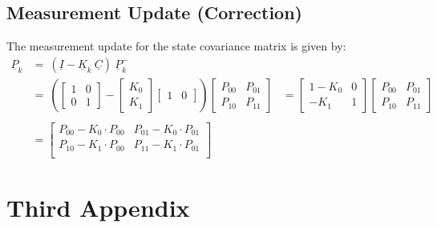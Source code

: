 \begin{appendices}
\subsection{Measurement Update (Correction)}
The measurement update for the state covariance matrix is given by:
\begin{equation}
	\begin{aligned}
		\underline{P}_{k} &= \ (\underline{I} - \underline{K}_{k} \ \underline{C}) \ \underline{P}_{k}^- \\ 
		&= \ \left( \begin{bmatrix} 
			1 & 0 \\ 
			0 & 1 
		\end{bmatrix}
		- 
		\begin{bmatrix} 
			K_{0} \\  
			K_{1} 
		\end{bmatrix} 
		\begin{bmatrix} 
			1 & 0 
		\end{bmatrix}  
		\right) 
		\begin{bmatrix}
			P_{00} & P_{01} \\ 
			P_{10} & P_{11} 
		\end{bmatrix} 
		&=  
		\begin{bmatrix} 
			1 - K_{0} & 0 \\ 
			-K_{1} & 1 
		\end{bmatrix} 
		\begin{bmatrix} 
			P_{00} & P_{01} \\ 
			P_{10} & P_{11} 
		\end{bmatrix}  \\ \\
		&= 
		\begin{bmatrix} 
			P_{00} - K_{0} \cdot P_{00} & P_{01} - K_{0} \cdot P_{01} \\
			P_{10} - K_{1} \cdot P_{00} & P_{11} - K_{1} \cdot P_{01} \\
		\end{bmatrix}  \label{eq:eq}
	\end{aligned}
\end{equation}
\section{Third Appendix} \label{appendix:C}

\end{appendices}
